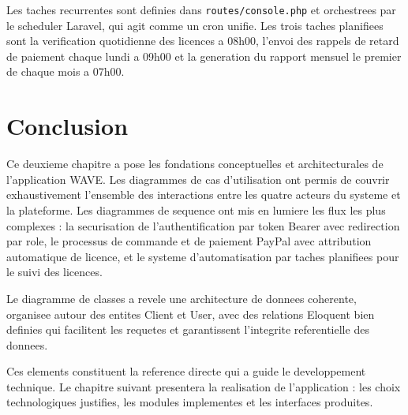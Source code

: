 Les taches recurrentes sont definies dans \texttt{routes/console.php}
et orchestrees par le scheduler Laravel, qui agit comme un cron unifie.
Les trois taches planifiees sont la verification quotidienne des licences
a 08h00, l'envoi des rappels de retard de paiement chaque lundi a 09h00
et la generation du rapport mensuel le premier de chaque mois a 07h00.

\section{Conclusion}

Ce deuxieme chapitre a pose les fondations conceptuelles et architecturales
de l'application WAVE. Les diagrammes de cas d'utilisation ont permis de
couvrir exhaustivement l'ensemble des interactions entre les quatre acteurs
du systeme et la plateforme. Les diagrammes de sequence ont mis en lumiere
les flux les plus complexes : la securisation de l'authentification par
token Bearer avec redirection par role, le processus de commande et de
paiement PayPal avec attribution automatique de licence, et le systeme
d'automatisation par taches planifiees pour le suivi des licences.

Le diagramme de classes a revele une architecture de donnees coherente,
organisee autour des entites Client et User, avec des relations Eloquent
bien definies qui facilitent les requetes et garantissent l'integrite
referentielle des donnees.

Ces elements constituent la reference directe qui a guide le developpement
technique. Le chapitre suivant presentera la realisation de l'application :
les choix technologiques justifies, les modules implementes et les
interfaces produites.